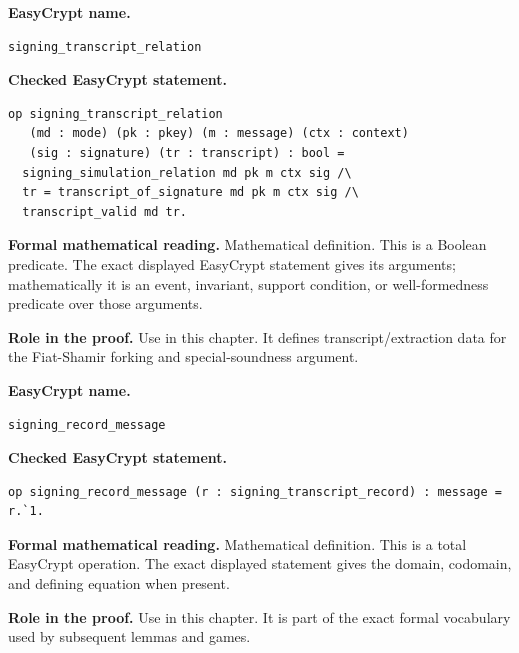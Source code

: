 \begin{formaldefinition}
\noindent\textbf{EasyCrypt name.}
\begin{lstlisting}[language=EasyCrypt,basicstyle=\ttfamily\scriptsize]
signing_transcript_relation
\end{lstlisting}
\noindent\textbf{Checked EasyCrypt statement.}
\begin{lstlisting}[language=EasyCrypt,basicstyle=\ttfamily\scriptsize]
op signing_transcript_relation
   (md : mode) (pk : pkey) (m : message) (ctx : context)
   (sig : signature) (tr : transcript) : bool =
  signing_simulation_relation md pk m ctx sig /\
  tr = transcript_of_signature md pk m ctx sig /\
  transcript_valid md tr.
\end{lstlisting}
\noindent\textbf{Formal mathematical reading.}
Mathematical definition. This is a Boolean predicate.  The exact displayed EasyCrypt statement gives its arguments; mathematically it is an event, invariant, support condition, or well-formedness predicate over those arguments.

\noindent\textbf{Role in the proof.}
Use in this chapter. It defines transcript/extraction data for the Fiat-Shamir forking and special-soundness argument.

\end{formaldefinition}

\begin{formaldefinition}
\noindent\textbf{EasyCrypt name.}
\begin{lstlisting}[language=EasyCrypt,basicstyle=\ttfamily\scriptsize]
signing_record_message
\end{lstlisting}
\noindent\textbf{Checked EasyCrypt statement.}
\begin{lstlisting}[language=EasyCrypt,basicstyle=\ttfamily\scriptsize]
op signing_record_message (r : signing_transcript_record) : message = r.`1.
\end{lstlisting}
\noindent\textbf{Formal mathematical reading.}
Mathematical definition. This is a total EasyCrypt operation.  The exact displayed statement gives the domain, codomain, and defining equation when present.

\noindent\textbf{Role in the proof.}
Use in this chapter. It is part of the exact formal vocabulary used by subsequent lemmas and games.

\end{formaldefinition}

